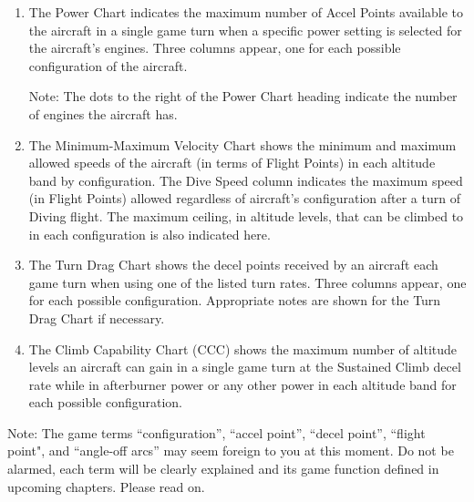 \begin{enumerate}
    \item {} The Power Chart indicates the maximum number of Accel Points available to the aircraft in a single game turn when a specific power setting is selected for the aircraft's engines. Three columns appear, one for each possible configuration of the aircraft. 

    Note: The dots to the right of the Power Chart heading indicate the number of engines the aircraft has.

    \item {} The Minimum-Maximum Velocity Chart shows the minimum and maximum allowed speeds of the aircraft (in terms of Flight Points) in each altitude band by configuration. The Dive Speed column indicates the maximum speed (in Flight Points) allowed regardless of aircraft's configuration after a turn of Diving flight. The maximum ceiling, in altitude levels, that can be climbed to in each configuration is also indicated here.

    \item {} The Turn Drag Chart shows the decel points received by an aircraft each game turn when using one of the listed turn rates. Three columns appear, one for each possible configuration. Appropriate notes are shown for the Turn Drag Chart if necessary.

    \item {} The Climb Capability Chart (CCC) shows the maximum number of altitude levels an aircraft can gain in a single game turn at the Sustained Climb decel rate while in afterburner power or any other power in each altitude band for each possible configuration.

\end{enumerate}

Note: The game terms “configuration”, “accel point”, “decel point”, “flight point", and “angle-off arcs” may seem foreign to you at this moment. Do not be alarmed, each term will be clearly explained and its game function defined in upcoming chapters. Please read on.

